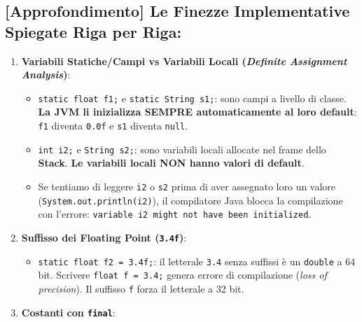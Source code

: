 \documentclass[11pt,a4paper,oneside]{report}
\newcommand{\passthrough}[1]{#1}
\providecommand{\tightlist}{\setlength{\itemsep}{0pt}\setlength{\parskip}{0pt}}
\begin{document}
\subsection{{[}Approfondimento{]} Le Finezze Implementative Spiegate
Riga per
Riga:}\label{chap04_approfondimento-le-finezze-implementative-spiegate-riga-per-riga}

\begin{enumerate}
\def\labelenumi{\arabic{enumi}.}
\tightlist
\item
  \textbf{Variabili Statiche/Campi vs Variabili Locali (\emph{Definite
  Assignment Analysis})}:

  \begin{itemize}
  \tightlist
  \item
    \passthrough{\lstinline!static float f1;!} e
    \passthrough{\lstinline!static String s1;!}: sono campi a livello di
    classe. \textbf{La JVM li inizializza SEMPRE automaticamente al loro
    default}: \passthrough{\lstinline!f1!} diventa
    \passthrough{\lstinline!0.0f!} e \passthrough{\lstinline!s1!}
    diventa \passthrough{\lstinline!null!}.
  \item
    \passthrough{\lstinline!int i2;!} e
    \passthrough{\lstinline!String s2;!}: sono variabili locali allocate
    nel frame dello \textbf{Stack}. \textbf{Le variabili locali NON
    hanno valori di default}.
  \item
    Se tentiamo di leggere \passthrough{\lstinline!i2!} o
    \passthrough{\lstinline!s2!} prima di aver assegnato loro un valore
    (\passthrough{\lstinline!System.out.println(i2)!}), il compilatore
    Java blocca la compilazione con l'errore:
    \passthrough{\lstinline!variable i2 might not have been initialized!}.
  \end{itemize}
\item
  \textbf{Suffisso dei Floating Point (\passthrough{\lstinline!3.4f!})}:

  \begin{itemize}
  \tightlist
  \item
    \passthrough{\lstinline!static float f2 = 3.4f;!}: il letterale
    \passthrough{\lstinline!3.4!} senza suffissi è un
    \passthrough{\lstinline!double!} a 64 bit. Scrivere
    \passthrough{\lstinline!float f = 3.4;!} genera errore di
    compilazione (\emph{loss of precision}). Il suffisso
    \passthrough{\lstinline!f!} forza il letterale a 32 bit.
  \end{itemize}
\item
  \textbf{Costanti con \passthrough{\lstinline!final!}}:


\end{enumerate}
\end{document}
